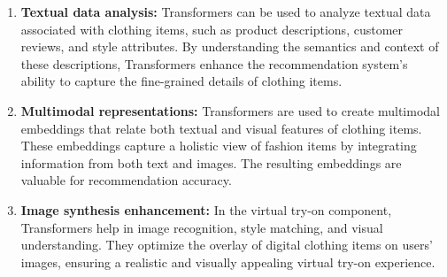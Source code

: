 	\begin{enumerate}
		\item \textbf{Textual data analysis:} Transformers can be used to analyze textual data associated with clothing items, such as product descriptions, customer reviews, and style attributes. By understanding the semantics and context of these descriptions, Transformers enhance the recommendation system's ability to capture the fine-grained details of clothing items.
		\item \textbf{Multimodal representations:} Transformers are used to create multimodal embeddings that relate both textual and visual features of clothing items. These embeddings capture a holistic view of fashion items by integrating information from both text and images. The resulting embeddings are valuable for recommendation accuracy.
		\item \textbf{Image synthesis enhancement:} In the virtual try-on component, Transformers help in image recognition, style matching, and visual understanding. They optimize the overlay of digital clothing items on users' images, ensuring a realistic and visually appealing virtual try-on experience.
	\end{enumerate}
